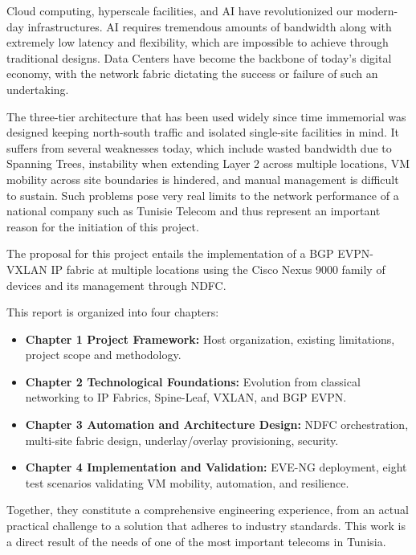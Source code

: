\begingroup
\setlength{\parindent}{1.5em}
\setlength{\parskip}{0.8\baselineskip}
\renewcommand{\labelitemi}{\large $\ast$}

\hspace{1.5em} Cloud computing, hyperscale facilities, and AI have revolutionized our modern-day infrastructures. AI requires tremendous amounts of bandwidth along with extremely low latency and flexibility, which are impossible to achieve through traditional designs. Data Centers have become the backbone of today’s digital economy, with the network fabric dictating the success or failure of such an undertaking.

The three-tier architecture that has been used widely since time immemorial was designed keeping north-south traffic and isolated single-site facilities in mind. It suffers from several weaknesses today, which include wasted bandwidth due to Spanning Trees, instability when extending Layer 2 across multiple locations, VM mobility across site boundaries is hindered, and manual management is difficult to sustain. Such problems pose very real limits to the network performance of a national company such as Tunisie Telecom and thus represent an important reason for the initiation of this project.

The proposal for this project entails the implementation of a BGP EVPN-VXLAN IP fabric at multiple locations using the Cisco Nexus 9000 family of devices and its management through NDFC.

This report is organized into four chapters:

\begin{itemize}
\item \textbf{Chapter 1 Project Framework:}
Host organization, existing limitations, project scope and methodology.
\item \textbf{Chapter 2 Technological Foundations:}
Evolution from classical networking to IP Fabrics, Spine-Leaf, VXLAN, and BGP EVPN.
\item \textbf{Chapter 3 Automation and Architecture Design:}
NDFC orchestration, multi-site fabric design, underlay/overlay provisioning, security.
\item \textbf{Chapter 4 Implementation and Validation:}
EVE-NG deployment, eight test scenarios validating VM mobility, automation, and resilience.
\end{itemize}

Together, they constitute a comprehensive engineering
experience, from an actual practical challenge to a
solution that adheres to industry standards. This work
is a direct result of the needs of one of the most
important telecoms in Tunisia.
\endgroup
